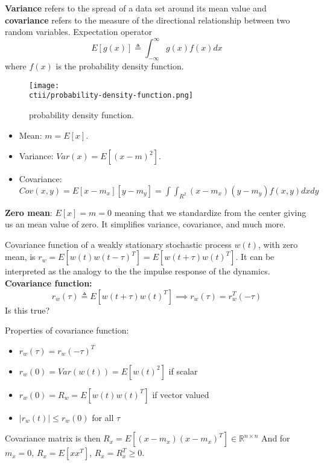 \begin{multicols}{2}
\textbf{Variance} refers to the spread of a data set around its mean value
and \textbf{covariance} refers to the measure of the directional relationship between two random variables.
Expectation operator
\begin{equation*}
    E[g(x)] \triangleq \int^{\infty}_{-\infty} g(x)f(x) dx
\end{equation*}
where $f(x)$ is the probability density function.
\begin{figure}[H]
    \centering
    \texttt{[image: \\ctii/probability-density-function.png]}
    \caption{probability density function.}
\end{figure}

\begin{itemize}
    \item Mean: $m=E[x]$.
    \item Variance: $Var(x)=E[(x-m)^2]$.
    \item Covariance: $Cov(x,y)=E[x-m_x][y-m_y]= \int\int_{R^2}(x-m_x)(y-m_y)f(x,y)dxdy$
\end{itemize}

\textbf{Zero mean}: $E[x] = m = 0$ meaning that we standardize from the center
giving us an mean value of zero. It simplifies variance, covariance, and much more.

Covariance function of a weakly stationary stochastic process $w(t)$, with zero mean, is 
$r_w = E[w(t)w(t-\tau)^T]=E[w(t+\tau)w(t)^T]$. 
It can be interpreted as the analogy to the the impulse response of the dynamics.
\textbf{Covariance function:}
\begin{equation*}
    r_w(\tau) \triangleq E[w(t+\tau)w(t)^T] \implies r_w(\tau) = r^T_w(-\tau)
\end{equation*} Is this true?

Properties of covariance function:
\begin{itemize}
    \item $r_w(\tau) = r_w(-\tau)^T$
    \item $r_w(0) = Var(w(t)) = E[w(t)^2]$ if scalar
    \item $r_w(0) = R_w = E[w(t)w(t)^T]$ if vector valued
    \item $|r_w(t)|\leq r_w(0)$ for all $\tau$
\end{itemize}

Covariance matrix is then $R_x = E[(x-m_x)(x-m_x)^T]\in\mathbb{R}^{n\times n}$
And for $m_x=0$, $R_x=E[xx^T]$, $R_x=R^T_x\geq0$.


\end{multicols}
